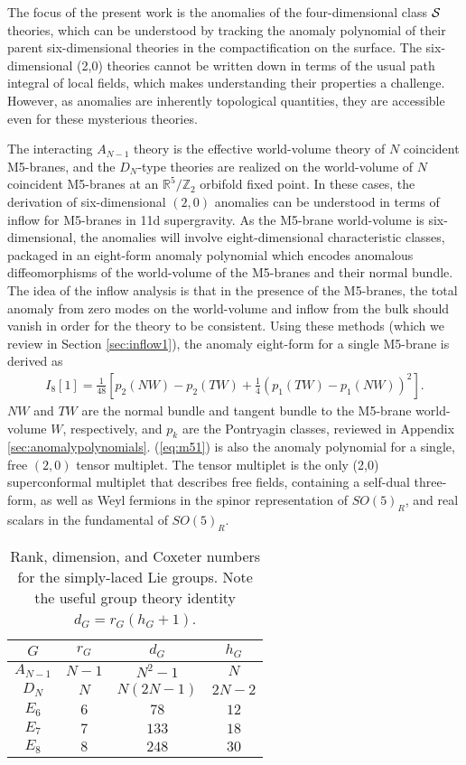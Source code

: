 \documentclass[a4paper,11pt]{article}
\newcommand{\ba}[1]{\begin{align} #1 \end{align} }
\def\CS{{\cal S}}
\begin{document}
The focus of the present work is the anomalies of the four-dimensional class $\CS$ theories, which can be understood by tracking the anomaly polynomial of their parent six-dimensional theories in the compactification on the surface. The six-dimensional (2,0) theories cannot be written down in terms of the usual path integral of local fields, which makes understanding their properties a challenge. However, as anomalies are inherently topological quantities, they are accessible even for these mysterious theories. 

The interacting $A_{N-1}$ theory is the effective world-volume theory of $N$ coincident M5-branes, and the $D_N$-type theories are realized on the world-volume of $N$ coincident M5-branes at an $\mathbb{R}^5/\mathbb{Z}_2$ orbifold fixed point. In these cases, the derivation of six-dimensional $(2,0)$ anomalies can be understood in terms of inflow for M5-branes in 11d supergravity. As the M5-brane world-volume is six-dimensional, the anomalies will involve eight-dimensional characteristic classes, packaged in an eight-form anomaly polynomial which encodes anomalous diffeomorphisms of the world-volume of the M5-branes and their normal bundle. The idea of the inflow analysis is that in the presence of the M5-branes, the total anomaly from zero modes on the world-volume and inflow from the bulk should vanish in order for the theory to be consistent. Using these methods (which we review in Section \ref{sec:inflow1}), the anomaly eight-form for a single M5-brane is derived as \cite{Witten:1996hc, Freed:1998tg}
	\ba{
	I_8[1]= \frac{1}{48} \left[ p_2(NW)-p_2(TW) + \frac{1}{4} \left( p_1(TW) - p_1(NW) \right)^2\right]. \label{eq:m51}
	}
$NW$ and $TW$ are the normal bundle and tangent bundle to the M5-brane world-volume $W$, respectively, and $p_k$ are the Pontryagin classes, reviewed in Appendix \ref{sec:anomalypolynomials}.  (\ref{eq:m51}) is also the anomaly polynomial for a single, free $(2,0)$ tensor multiplet. The tensor multiplet is the only (2,0) superconformal multiplet that describes free fields, containing a self-dual three-form, as well as Weyl fermions in the spinor representation of $SO(5)_R$, and real scalars in the fundamental of $SO(5)_R$.

	\begin{table}[t!]
	\centering
	\begin{tabular}{|c|c|c|c|}
	\hline 
	$G$ & $r_G$ & $d_G$ & $h_G$ \\ \hline 
	$A_{N-1}$ & $N-1$ & $N^2-1$ & $N$ \\
	$D_{N}$ & $N$ & $N(2N-1)$ & $2N-2$ \\
	$E_6$ & $6$ & $78$ & $12$ \\
	$E_7$ & $7$ & $133$ & $18$ \\
	$E_8$ & $8$ & $248$ & $30$ \\ \hline
	\end{tabular}
	\caption{Rank, dimension, and Coxeter numbers for the simply-laced Lie groups. Note the useful group theory identity $d_G=r_G(h_G+1)$.\label{tab:numbers}}
	\end{table}
\end{document}

